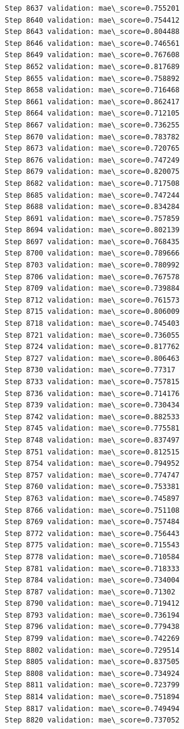 \documentclass[11pt]{article}
\begin{document}
\begin{Verbatim}[commandchars=\\\{\}]
Step 8637 validation: mae\_score=0.755201
Step 8640 validation: mae\_score=0.754412
Step 8643 validation: mae\_score=0.804488
Step 8646 validation: mae\_score=0.746561
Step 8649 validation: mae\_score=0.767608
Step 8652 validation: mae\_score=0.817689
Step 8655 validation: mae\_score=0.758892
Step 8658 validation: mae\_score=0.716468
Step 8661 validation: mae\_score=0.862417
Step 8664 validation: mae\_score=0.712105
Step 8667 validation: mae\_score=0.736255
Step 8670 validation: mae\_score=0.783782
Step 8673 validation: mae\_score=0.720765
Step 8676 validation: mae\_score=0.747249
Step 8679 validation: mae\_score=0.820075
Step 8682 validation: mae\_score=0.717508
Step 8685 validation: mae\_score=0.747244
Step 8688 validation: mae\_score=0.834284
Step 8691 validation: mae\_score=0.757859
Step 8694 validation: mae\_score=0.802139
Step 8697 validation: mae\_score=0.768435
Step 8700 validation: mae\_score=0.789666
Step 8703 validation: mae\_score=0.780992
Step 8706 validation: mae\_score=0.767578
Step 8709 validation: mae\_score=0.739884
Step 8712 validation: mae\_score=0.761573
Step 8715 validation: mae\_score=0.806009
Step 8718 validation: mae\_score=0.745403
Step 8721 validation: mae\_score=0.736055
Step 8724 validation: mae\_score=0.817762
Step 8727 validation: mae\_score=0.806463
Step 8730 validation: mae\_score=0.77317
Step 8733 validation: mae\_score=0.757815
Step 8736 validation: mae\_score=0.714176
Step 8739 validation: mae\_score=0.730434
Step 8742 validation: mae\_score=0.882533
Step 8745 validation: mae\_score=0.775581
Step 8748 validation: mae\_score=0.837497
Step 8751 validation: mae\_score=0.812515
Step 8754 validation: mae\_score=0.794952
Step 8757 validation: mae\_score=0.774747
Step 8760 validation: mae\_score=0.753381
Step 8763 validation: mae\_score=0.745897
Step 8766 validation: mae\_score=0.751108
Step 8769 validation: mae\_score=0.757484
Step 8772 validation: mae\_score=0.756443
Step 8775 validation: mae\_score=0.715543
Step 8778 validation: mae\_score=0.710584
Step 8781 validation: mae\_score=0.718333
Step 8784 validation: mae\_score=0.734004
Step 8787 validation: mae\_score=0.71302
Step 8790 validation: mae\_score=0.719412
Step 8793 validation: mae\_score=0.736194
Step 8796 validation: mae\_score=0.779438
Step 8799 validation: mae\_score=0.742269
Step 8802 validation: mae\_score=0.729514
Step 8805 validation: mae\_score=0.837505
Step 8808 validation: mae\_score=0.734924
Step 8811 validation: mae\_score=0.723799
Step 8814 validation: mae\_score=0.751894
Step 8817 validation: mae\_score=0.749494
Step 8820 validation: mae\_score=0.737052

\end{Verbatim}
\end{document}
